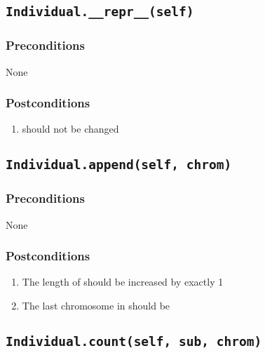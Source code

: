 \documentclass[letterpaper,10pt,english]{sphinxmanual}
\begin{document}
\subsection{\texttt{Individual.\_\_repr\_\_(self)}}
\label{contracts:individual-repr-self}

\subsubsection{Preconditions}
\label{contracts:id11}
None


\subsubsection{Postconditions}
\label{contracts:id12}\begin{enumerate}
\item {} 
 should not be changed

\end{enumerate}


\subsection{\texttt{Individual.append(self, chrom)}}
\label{contracts:individual-append-self-chrom}

\subsubsection{Preconditions}
\label{contracts:id13}
None


\subsubsection{Postconditions}
\label{contracts:id14}\begin{enumerate}
\item {} 
The length of  should be increased by exactly 1

\item {} 
The last chromosome in  should be 

\end{enumerate}


\subsection{\texttt{Individual.count(self, sub, chrom)}}
\label{contracts:individual-count-self-sub-chrom}
\end{document}
